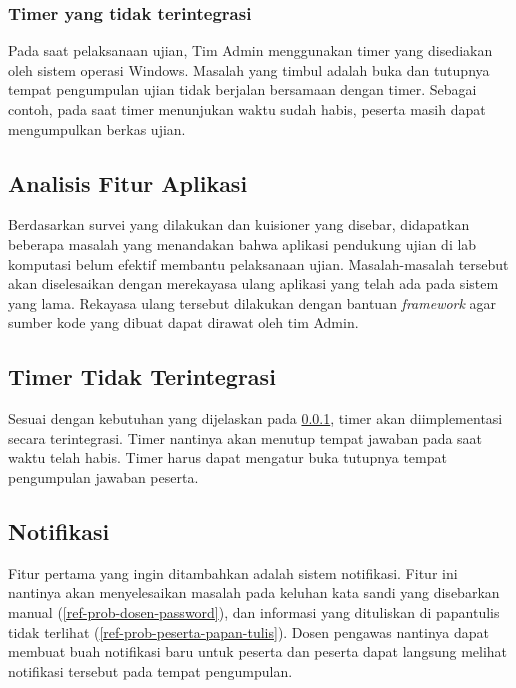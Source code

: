     \subsubsection{Timer yang tidak
    terintegrasi}\label{ref-prob-admin-timer-integrated} Pada saat pelaksanaan
    ujian, Tim Admin menggunakan timer yang disediakan oleh sistem operasi
    Windows. Masalah yang timbul adalah buka dan tutupnya tempat pengumpulan
    ujian tidak berjalan bersamaan dengan timer. Sebagai contoh, pada saat timer
    menunjukan waktu sudah habis, peserta masih dapat mengumpulkan berkas ujian.
    
    
\subsection{Analisis Fitur Aplikasi}
    Berdasarkan survei yang dilakukan dan kuisioner yang disebar, didapatkan
    beberapa masalah yang menandakan bahwa aplikasi pendukung ujian di lab
    komputasi belum efektif membantu pelaksanaan ujian. Masalah-masalah tersebut
    akan diselesaikan dengan merekayasa ulang aplikasi yang telah ada pada
    sistem yang lama. Rekayasa ulang tersebut dilakukan dengan bantuan
    \textit{framework} agar sumber kode yang dibuat dapat dirawat oleh tim
    Admin.
    
    \subsection{Timer Tidak Terintegrasi}
        Sesuai dengan kebutuhan yang dijelaskan pada
        \ref{ref-prob-admin-timer-integrated}, timer akan diimplementasi secara
        terintegrasi. Timer nantinya akan menutup tempat jawaban pada saat waktu
        telah habis. Timer harus dapat mengatur buka tutupnya tempat pengumpulan
        jawaban peserta.
    
    \subsection{Notifikasi}
        Fitur pertama yang ingin ditambahkan adalah sistem notifikasi. Fitur ini
        nantinya akan menyelesaikan masalah pada keluhan kata sandi yang
        disebarkan manual (\ref{ref-prob-dosen-password}), dan informasi yang
        dituliskan di papantulis tidak terlihat
        (\ref{ref-prob-peserta-papan-tulis}). Dosen pengawas nantinya dapat
        membuat buah notifikasi baru untuk peserta dan peserta dapat langsung
        melihat notifikasi tersebut pada tempat pengumpulan.

